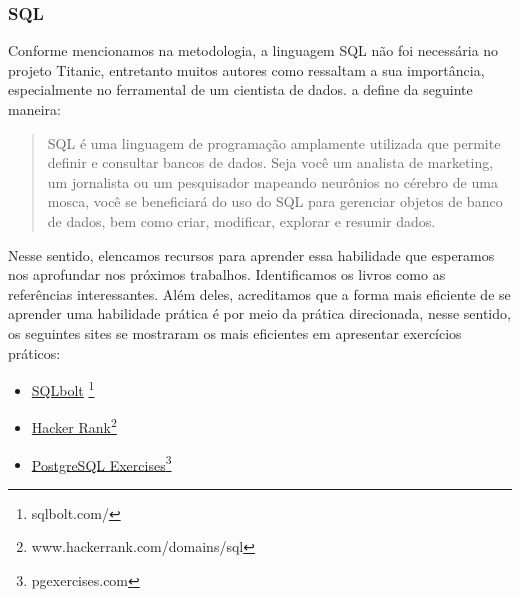 \documentclass{article}
\begin{document}
 \subsubsection{SQL}
Conforme mencionamos na metodologia, a linguagem SQL não foi necessária no projeto Titanic, entretanto muitos autores como \cite{SCRATCH,DATAPYTHON} ressaltam a sua importância, especialmente no ferramental de um cientista de dados. \cite{debarros2022practical} a define da seguinte maneira:
\begin{quote}
    SQL é uma linguagem de programação amplamente utilizada que permite definir e consultar bancos de dados. Seja você um analista de marketing, um jornalista ou um pesquisador mapeando neurônios no cérebro de uma mosca, você se beneficiará do uso do SQL para gerenciar objetos de banco de dados, bem como criar, modificar, explorar e resumir dados. 
\end{quote}

Nesse sentido, elencamos recursos para aprender essa habilidade que esperamos nos aprofundar nos próximos trabalhos. Identificamos os livros \cite{debarros2022practical,Silberschatz2019DBS} como as referências interessantes. Além deles, acreditamos que a forma mais eficiente de se aprender uma habilidade prática é por meio da prática direcionada, nesse sentido, os seguintes sites se mostraram os mais eficientes em apresentar exercícios práticos: 
\begin{itemize}
\item \href{https://sqlbolt.com/}{SQLbolt} \footnote{sqlbolt.com/}
\item \href{https://www.hackerrank.com/domains/sql}{Hacker Rank}\footnote{www.hackerrank.com/domains/sql}
\item \href{https://pgexercises.com/}{PostgreSQL Exercises}\footnote{pgexercises.com}
\end{itemize}
 
\end{document}
